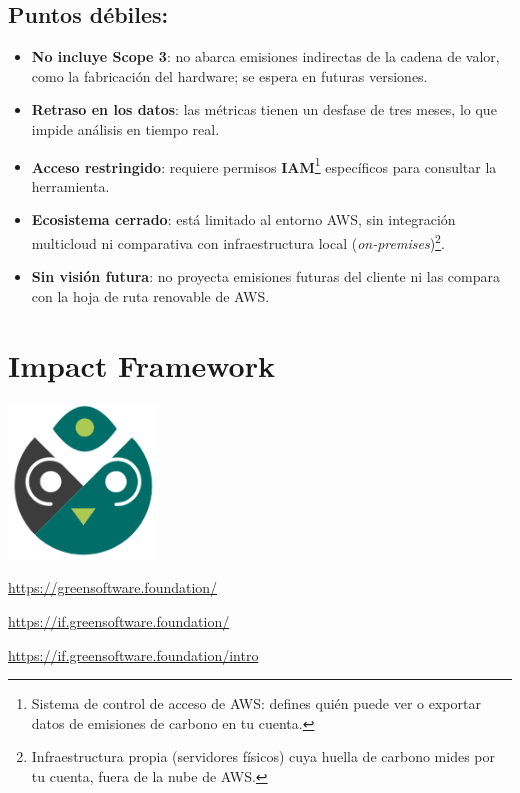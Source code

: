 \documentclass[12pt,a4paper]{report}
\begin{document}
\subsection*{Puntos débiles:}
\begin{itemize}
  \item \textbf{No incluye Scope 3}: no abarca emisiones indirectas de la cadena de valor, como la fabricación del hardware; se espera en futuras versiones.
  \item \textbf{Retraso en los datos}: las métricas tienen un desfase de tres meses, lo que impide análisis en tiempo real.
  \item \textbf{Acceso restringido}: requiere permisos \textbf{IAM}\footnote{Sistema de control de acceso de AWS: defines quién puede ver o exportar datos de emisiones de carbono en tu cuenta.} específicos para consultar la herramienta.
  \item \textbf{Ecosistema cerrado}: está limitado al entorno AWS, sin integración multicloud ni comparativa con infraestructura local (\textit{on-premises})\footnote{Infraestructura propia (servidores físicos) cuya huella de carbono mides por tu cuenta, fuera de la nube de AWS.}.
  \item \textbf{Sin visión futura}: no proyecta emisiones futuras del cliente ni las compara con la hoja de ruta renovable de AWS.
\end{itemize}

\section*{Impact Framework}

\begin{center}
\includegraphics[width=0.3\textwidth]{imagenes/Impact_Logo.png}
\end{center}

\href{https://greensoftware.foundation/}{https://greensoftware.foundation/}

\href{https://if.greensoftware.foundation/}{https://if.greensoftware.foundation/}

\href{https://if.greensoftware.foundation/intro}{https://if.greensoftware.foundation/intro}
\end{document}
